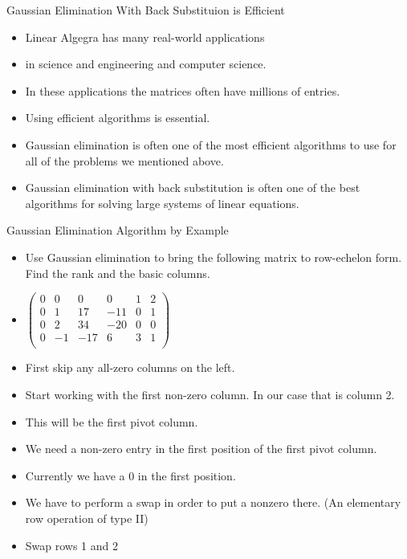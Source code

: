 \documentclass{beamer}
\begin{document}

\begin{frame}{Gaussian Elimination With Back Substituion is Efficient}

\begin{itemize}
\item Linear Algegra has many real-world applications
\item in science and engineering and computer science.
\item In these applications the matrices often have millions of entries.
\item Using efficient algorithms is essential.
\item Gaussian elimination is often one of the most efficient algorithms
to use for all of the problems we mentioned above.
\item Gaussian elimination with back substitution is often one of the
best algorithms for solving large systems of linear equations.
\end{itemize}
\end{frame}


\begin{frame}{Gaussian Elimination Algorithm by Example}

\begin{itemize}
\item Use Gaussian elimination to bring the following matrix to row-echelon
form. Find the rank and the basic columns.
\item $
\begin{pmatrix}
0 & 0  &   0  &  0   &  1  &  2 \\
0 & 1  &  17  & -11  &  0  &  1  \\
0 & 2  &  34  & -20  &  0  &  0 \\
0 & -1 &  -17   &  6 &  3  &  1 \\
\end{pmatrix}
$
\item First skip any all-zero columns on the left.
\item Start working with the first non-zero column. In our case that is column 2.
\item This will be the first pivot column.
\item We need a non-zero entry in the first position of the first pivot column.
\item Currently we have a 0 in the first position.
\item We have to perform a swap in order to put a nonzero there. (An elementary row operation of type II)
\item Swap rows 1 and 2
\end{itemize}
\end{frame}
\end{document}
